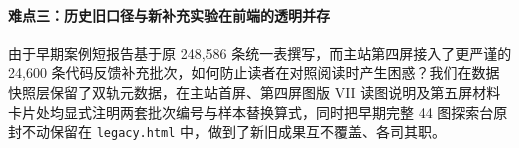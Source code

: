 \paragraph{难点三：历史旧口径与新补充实验在前端的透明并存}由于早期案例短报告基于原 248,586 条统一表撰写，而主站第四屏接入了更严谨的 24,600 条代码反馈补充批次，如何防止读者在对照阅读时产生困惑？我们在数据快照层保留了双轨元数据，在主站首屏、第四屏图版 VII 读图说明及第五屏材料卡片处均显式注明两套批次编号与样本替换算式，同时把早期完整 44 图探索台原封不动保留在 \texttt{legacy.html} 中，做到了新旧成果互不覆盖、各司其职。
